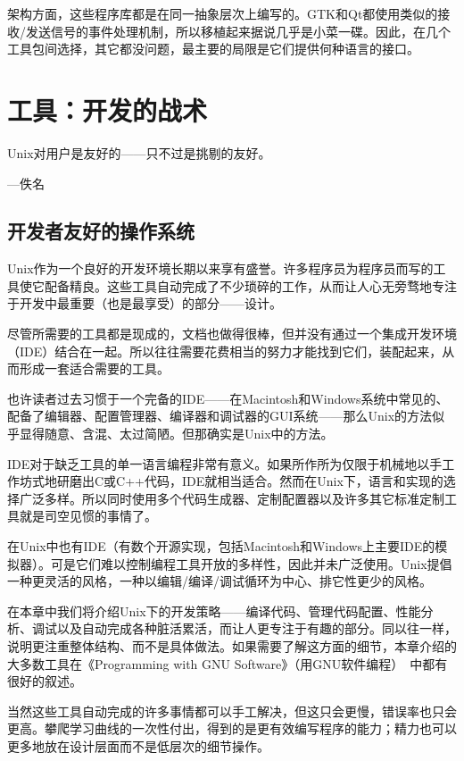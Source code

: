 \documentclass[12pt,oneside]{ctexbook}
\begin{document}
\begin{common-format}
架构方面，这些程序库都是在同一抽象层次上编写的。GTK和Qt都使用类似的接收/发送信号的事件处理机制，所以移植起来据说几乎是小菜一碟。因此，在几个工具包间选择，其它都没问题，最主要的局限是它们提供何种语言的接口。



\chapter{工具：开发的战术}
\begin{flushright}
\begin{notecard}{15em}
Unix对用户是友好的——只不过是挑剔的友好。

{\hfill —佚名}
\end{notecard}
\end{flushright}

\section{开发者友好的操作系统}
Unix作为一个良好的开发环境长期以来享有盛誉。许多程序员为程序员而写的工具使它配备精良。这些工具自动完成了不少琐碎的工作，从而让人心无旁骛地专注于开发中最重要（也是最享受）的部分——设计。

尽管所需要的工具都是现成的，文档也做得很棒，但并没有通过一个集成开发环境（IDE）结合在一起。所以往往需要花费相当的努力才能找到它们，装配起来，从而形成一套适合需要的工具。

也许读者过去习惯于一个完备的IDE——在Macintosh和Windows系统中常见的、配备了编辑器、配置管理器、编译器和调试器的GUI系统——那么Unix的方法似乎显得随意、含混、太过简陋。但那确实是Unix中的方法。

IDE对于缺乏工具的单一语言编程非常有意义。如果所作所为仅限于机械地以手工作坊式地研磨出C或C++代码，IDE就相当适合。然而在Unix下，语言和实现的选择广泛多样。所以同时使用多个代码生成器、定制配置器以及许多其它标准定制工具就是司空见惯的事情了。

在Unix中也有IDE（有数个开源实现，包括Macintosh和Windows上主要IDE的模拟器）。可是它们难以控制编程工具开放的多样性，因此并未广泛使用。Unix提倡一种更灵活的风格，一种以编辑/编译/调试循环为中心、排它性更少的风格。

在本章中我们将介绍Unix下的开发策略——编译代码、管理代码配置、性能分析、调试以及自动完成各种脏活累活，而让人更专注于有趣的部分。同以往一样，说明更注重整体结构、而不是具体做法。如果需要了解这方面的细节，本章介绍的大多数工具在《Programming with GNU Software》（用GNU软件编程）~\cite{Loukides-Oram}中都有很好的叙述。

当然这些工具自动完成的许多事情都可以手工解决，但这只会更慢，错误率也只会更高。攀爬学习曲线的一次性付出，得到的是更有效编写程序的能力；精力也可以更多地放在设计层面而不是低层次的细节操作。


\end{common-format}
\end{document}
